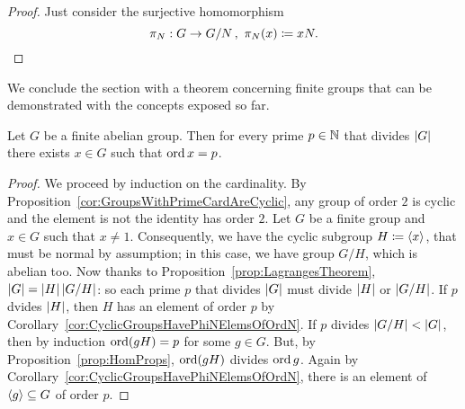 \begin{proof}
Just consider the surjective homomorphism
\[\pi_N : G \to G/N\,, \ \pi_N(x) \coloneq xN .\qedhere\]
\end{proof}

We conclude the section with a theorem concerning finite groups that can be demonstrated with the concepts exposed so far.

\begin{proposition}\label{prop:PreCauchysTheorem}
Let \(G\) be a finite abelian group. Then for every prime \(p \in \mathbb N\) that divides \(\left\lvert G\right\rvert\) there exists \(x \in G\) such that \(\operatorname{ord} x = p\).
\end{proposition}

\begin{proof}
We proceed by induction on the cardinality. By Proposition~\ref{cor:GroupsWithPrimeCardAreCyclic}, any group of order \(2\) is cyclic and the element is not the identity has order \(2\). Let \(G\) be a finite group and \(x \in G\) such that \(x \ne 1\). Consequently, we have the cyclic subgroup \(H \coloneq \left\langle x\right\rangle\), that must be normal by assumption; in this case, we have group \(G/H\), which is abelian too. Now thanks to Proposition~\ref{prop:LagrangesTheorem}, \(\left\lvert G\right\rvert = \left\lvert H\right\rvert \left\lvert G/H\right\rvert\): so each prime \(p\) that divides \(\left\lvert G\right\rvert\) must divide \(\left\lvert H\right\rvert\) or \(\left\lvert G/H\right\rvert\). If \(p\) dvides \(\left\lvert H\right\rvert\), then \(H\) has an element of order \(p\) by Corollary~\ref{cor:CyclicGroupsHavePhiNElemsOfOrdN}. If \(p\) divides \(\left\lvert G/H\right\rvert < \left\lvert G\right\rvert\), then by induction \(\operatorname{ord} (gH) = p\) for some \(g \in G\). But, by Proposition~\ref{prop:HomProps}, \(\operatorname{ord} (gH)\) divides \(\operatorname{ord} g\). Again by Corollary~\ref{cor:CyclicGroupsHavePhiNElemsOfOrdN}, there is an element of \(\left\langle g\right\rangle \subseteq G\) of order \(p\).
\end{proof}
